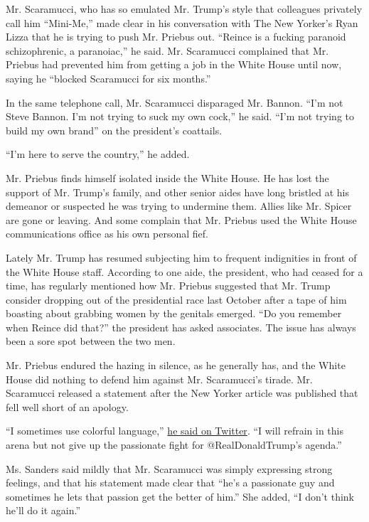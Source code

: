 Mr. Scaramucci, who has so emulated Mr. Trump's style that colleagues
privately call him ``Mini-Me,'' made clear in his conversation with The
New Yorker's Ryan Lizza that he is trying to push Mr. Priebus out.
``Reince is a fucking paranoid schizophrenic, a paranoiac,'' he said.
Mr. Scaramucci complained that Mr. Priebus had prevented him from
getting a job in the White House until now, saying he ``blocked
Scaramucci for six months.''

In the same telephone call, Mr. Scaramucci disparaged Mr. Bannon. ``I'm
not Steve Bannon. I'm not trying to suck my own cock,'' he said. ``I'm
not trying to build my own brand'' on the president's coattails.

``I'm here to serve the country,'' he added.

Mr. Priebus finds himself isolated inside the White House. He has lost
the support of Mr. Trump's family, and other senior aides have long
bristled at his demeanor or suspected he was trying to undermine them.
Allies like Mr. Spicer are gone or leaving. And some complain that Mr.
Priebus used the White House communications office as his own personal
fief.

Lately Mr. Trump has resumed subjecting him to frequent indignities in
front of the White House staff. According to one aide, the president,
who had ceased for a time, has regularly mentioned how Mr. Priebus
suggested that Mr. Trump consider dropping out of the presidential race
last October after a tape of him boasting about grabbing women by the
genitals emerged. ``Do you remember when Reince did that?'' the
president has asked associates. The issue has always been a sore spot
between the two men.

Mr. Priebus endured the hazing in silence, as he generally has, and the
White House did nothing to defend him against Mr. Scaramucci's tirade.
Mr. Scaramucci released a statement after the New Yorker article was
published that fell well short of an apology.

``I sometimes use colorful language,''
\href{https://twitter.com/Scaramucci/status/890699212022796288}{he said
on Twitter}. ``I will refrain in this arena but not give up the
passionate fight for @RealDonaldTrump's agenda.''

Ms. Sanders said mildly that Mr. Scaramucci was simply expressing strong
feelings, and that his statement made clear that ``he's a passionate guy
and sometimes he lets that passion get the better of him.'' She added,
``I don't think he'll do it again.''


